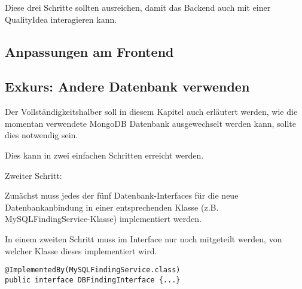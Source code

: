 Diese drei Schritte sollten ausreichen, damit das Backend auch mit einer QualityIdea interagieren kann. 

\subsection{Anpassungen am Frontend}

\subsection{Exkurs: Andere Datenbank verwenden}
Der Vollständigkeitshalber soll in diesem Kapitel auch erläutert werden, wie die momentan verwendete MongoDB Datenbank ausgewechselt werden kann, sollte dies notwendig sein.

Dies kann in zwei einfachen Schritten erreicht werden.

\begin{labeling}{Zweiter Schritt:}
	\item [Erster Schritt:] Zunächst muss jedes der fünf Datenbank-Interfaces für die neue Datenbankanbindung in einer entsprechenden Klasse (z.B. MySQL\-Finding\-Service-Klasse) implementiert werden. 
	\item [Zweiter Schritt:] In einem zweiten Schritt muss im Interface nur noch mitgeteilt werden, von welcher Klasse dieses implementiert wird.

\begin{lstlisting}[caption={Andere Datenbank verwenden}, label=changeDatabase]
@ImplementedBy(MySQLFindingService.class)
public interface DBFindingInterface {...}
\end{lstlisting}
\end{labeling}
